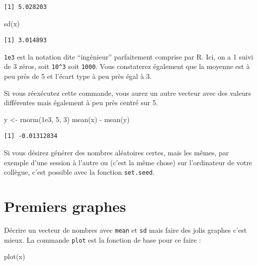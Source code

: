 \documentclass[
  letterpaper,
  DIV=11,
  numbers=noendperiod]{scrreprt}
\newenvironment{Shaded}{\begin{snugshade}}{\end{snugshade}}
\newcommand{\DecValTok}[1]{\textcolor[rgb]{0.68,0.00,0.00}{#1}}
\newcommand{\FloatTok}[1]{\textcolor[rgb]{0.68,0.00,0.00}{#1}}
\newcommand{\FunctionTok}[1]{\textcolor[rgb]{0.28,0.35,0.67}{#1}}
\newcommand{\NormalTok}[1]{\textcolor[rgb]{0.00,0.23,0.31}{#1}}
\newcommand{\OtherTok}[1]{\textcolor[rgb]{0.00,0.23,0.31}{#1}}
\newcommand{\SpecialCharTok}[1]{\textcolor[rgb]{0.37,0.37,0.37}{#1}}
\begin{document}
\begin{verbatim}
[1] 5.028203
\end{verbatim}

\begin{Shaded}
\begin{Highlighting}[]
\FunctionTok{sd}\NormalTok{(x)}
\end{Highlighting}
\end{Shaded}

\begin{verbatim}
[1] 3.014893
\end{verbatim}

\texttt{1e3} est la notation dite ``ingénieur'' parfaitement comprise
par R. Ici, on a 1 suivi de 3 zéros, soit \texttt{10\^{}3} soit
\texttt{1000}. Vous constaterez également que la moyenne est à peu près
de 5 et l'écart type à peu près égal à 3.

Si vous réexécutez cette commande, vous aurez un autre vecteur avec des
valeurs différentes mais également à peu près centré sur 5.

\begin{Shaded}
\begin{Highlighting}[]
\NormalTok{y }\OtherTok{\textless{}{-}} \FunctionTok{rnorm}\NormalTok{(}\FloatTok{1e3}\NormalTok{, }\DecValTok{5}\NormalTok{, }\DecValTok{3}\NormalTok{)}
\FunctionTok{mean}\NormalTok{(x) }\SpecialCharTok{{-}} \FunctionTok{mean}\NormalTok{(y)}
\end{Highlighting}
\end{Shaded}

\begin{verbatim}
[1] -0.01312834
\end{verbatim}

Si vous désirez générer des nombres aléatoires certes, mais les mêmes,
par exemple d'une session à l'autre ou (c'est la même chose) sur
l'ordinateur de votre collègue, c'est possible avec la fonction
\texttt{set.seed}.

\hypertarget{premiers-graphes}{%
\section{Premiers graphes}\label{premiers-graphes}}

Décrire un vecteur de nombres avec \texttt{mean} et \texttt{sd} mais
faire des jolis graphes c'est mieux. La commande \texttt{plot} est la
fonction de base pour ce faire :

\begin{Shaded}
\begin{Highlighting}[]
\FunctionTok{plot}\NormalTok{(x)}
\end{Highlighting}
\end{Shaded}
\end{document}
